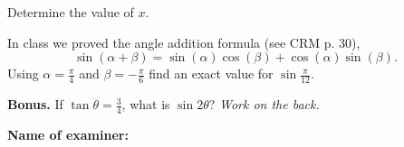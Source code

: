 \documentclass[8pt]{exam}
\begin{document}
\begin{questions}

\question[4] Determine the value of $x$.

\begin{minipage}{0.7\textwidth}
\vspace{0mm}

\fillwithdottedlines{49mm}

\end{minipage}
\begin{minipage}{0.25\textwidth}

\end{minipage}
\vspace{-4mm}


\question[2] In class we proved the angle addition formula (see CRM p. 30), $$\sin(\alpha + \beta) = \sin(\alpha) \cos(\beta) + \cos(\alpha) \sin(\beta).$$ Using $\alpha = \frac{\pi}{4}$ and $\beta = -\frac{\pi}{6}$ find an exact value for $\sin \frac{\pi}{12}$.


\question[0] \textbf{Bonus.} If $\tan \theta = \frac{3}{4}$, what is $\sin 2 \theta$? \hfill \emph{Work on the back.}
\end{questions}


\begin{tcolorbox}

\textbf{Name of examiner:}

\begin{center}
\gradetable[h][questions]
\end{center}

\end{tcolorbox}
\end{document}

